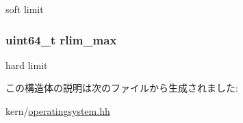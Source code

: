 soft limit \hypertarget{structOperatingSystem_1_1rlimit_af8e4fdfd658610e9b762fb606dce339a}{
\subsubsection[{rlim\_\-max}]{\setlength{\rightskip}{0pt plus 5cm}uint64\_\-t {\bf rlim\_\-max}}}
\label{structOperatingSystem_1_1rlimit_af8e4fdfd658610e9b762fb606dce339a}


hard limit 

この構造体の説明は次のファイルから生成されました:\begin{DoxyCompactItemize}
\item 
kern/\hyperlink{operatingsystem_8hh}{operatingsystem.hh}\end{DoxyCompactItemize}
